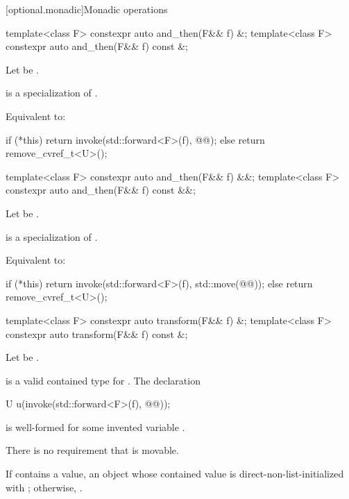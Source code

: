 [optional.monadic]{Monadic operations}

\begin{itemdecl}
template<class F> constexpr auto and_then(F&& f) &;
template<class F> constexpr auto and_then(F&& f) const &;
\end{itemdecl}

\begin{itemdescr}
\pnum
Let  be .

\pnum
\mandates
{} is a specialization of .

\pnum
\effects
Equivalent to:
\begin{codeblock}
if (*this) {
  return invoke(std::forward<F>(f), @@);
} else {
  return remove_cvref_t<U>();
}
\end{codeblock}
\end{itemdescr}

\begin{itemdecl}
template<class F> constexpr auto and_then(F&& f) &&;
template<class F> constexpr auto and_then(F&& f) const &&;
\end{itemdecl}

\begin{itemdescr}
\pnum
Let  be .

\pnum
\mandates
{} is a specialization of .

\pnum
\effects
Equivalent to:
\begin{codeblock}
if (*this) {
  return invoke(std::forward<F>(f), std::move(@@));
} else {
  return remove_cvref_t<U>();
}
\end{codeblock}
\end{itemdescr}

\begin{itemdecl}
template<class F> constexpr auto transform(F&& f) &;
template<class F> constexpr auto transform(F&& f) const &;
\end{itemdecl}

\begin{itemdescr}
\pnum
Let  be .

\pnum
\mandates
{} is a valid contained type for .
The declaration
\begin{codeblock}
U u(invoke(std::forward<F>(f), @@));
\end{codeblock}
is well-formed for some invented variable .
\begin{note}
There is no requirement that  is movable.
\end{note}

\pnum
\returns
If  contains a value, an  object
whose contained value is direct-non-list-initialized with
;
otherwise, .
\end{itemdescr}


